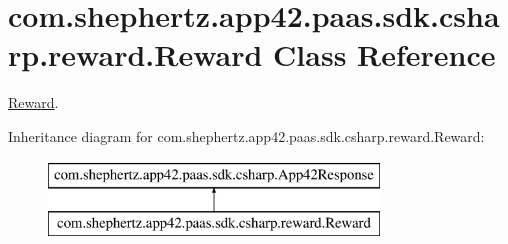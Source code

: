 \hypertarget{classcom_1_1shephertz_1_1app42_1_1paas_1_1sdk_1_1csharp_1_1reward_1_1_reward}{\section{com.\+shephertz.\+app42.\+paas.\+sdk.\+csharp.\+reward.\+Reward Class Reference}
\label{classcom_1_1shephertz_1_1app42_1_1paas_1_1sdk_1_1csharp_1_1reward_1_1_reward}
}


\hyperlink{classcom_1_1shephertz_1_1app42_1_1paas_1_1sdk_1_1csharp_1_1reward_1_1_reward}{Reward}.  


Inheritance diagram for com.\+shephertz.\+app42.\+paas.\+sdk.\+csharp.\+reward.\+Reward\+:\begin{figure}[H]
\begin{center}
\leavevmode
\includegraphics[height=2.000000cm]{classcom_1_1shephertz_1_1app42_1_1paas_1_1sdk_1_1csharp_1_1reward_1_1_reward}
\end{center}
\end{figure}
